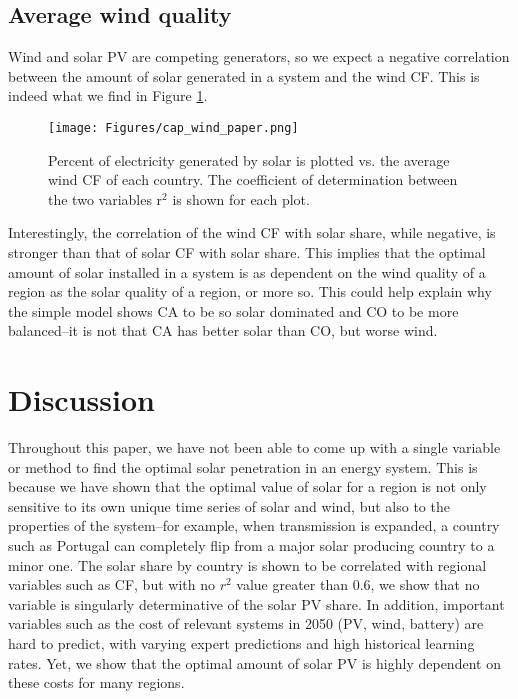\documentclass[lettersize,journal]{IEEEtran}
\begin{document}
\subsection{Average wind quality}

Wind and solar PV are competing generators, so we expect a negative correlation between the amount of solar generated in a system and the wind CF. This is indeed what we find in Figure \ref{fig: solar_by_windcf}.


\begin{figure}[H]
\centering
\texttt{[image: Figures/cap\_wind\_paper.png]}

\caption{ Percent of electricity generated by solar is plotted vs. the average wind CF of each country.  The coefficient of determination between the two variables r$^2$ is shown for each plot.} 
\label{fig: solar_by_windcf} 
\end{figure}

Interestingly, the correlation of the wind CF with solar share, while negative, is stronger than that of solar CF with solar share. This implies that the optimal amount of solar installed in a system is as dependent on the wind quality of a region as the solar quality of a region, or more so. This could help explain why the simple model shows CA to be so solar dominated and CO to be more balanced--it is not that CA has better solar than CO, but worse wind. 


\section{Discussion}

Throughout this paper, we have not been able to come up with a single variable or method to find the optimal solar penetration in an energy system. This is because we have shown that the optimal value of solar for a region is not only sensitive to its own unique time series of solar and wind, but also to the properties of the system--for example, when transmission is expanded, a country such as Portugal can completely flip from a major solar producing country to a minor one. The solar share by country is shown to be correlated with regional variables such as CF, but with no $r^2$ value greater than 0.6, we show that no variable is singularly determinative of the solar PV share. In addition, important variables such as the cost of relevant systems in 2050 (PV, wind, battery) are hard to predict, with varying expert predictions and high historical learning rates. Yet, we show that the optimal amount of solar PV is highly dependent on these costs for many regions. 
\end{document}
